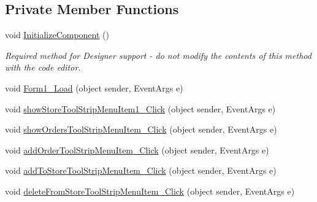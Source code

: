 \subsection*{Private Member Functions}
\begin{DoxyCompactItemize}
\item 
void \hyperlink{classproject__bot_1_1_form1_af9d680db4a881806f9fe79ba1c002df1}{Initialize\+Component} ()
\begin{DoxyCompactList}\small\item\em Required method for Designer support -\/ do not modify the contents of this method with the code editor. \end{DoxyCompactList}\item 
void \hyperlink{classproject__bot_1_1_form1_a6d312730b58049c8ee8527ca44bea75e}{Form1\+\_\+\+Load} (object sender, Event\+Args e)
\item 
void \hyperlink{classproject__bot_1_1_form1_a16b4ae77e7e32404669455ab50a7cc4e}{show\+Store\+Tool\+Strip\+Menu\+Item1\+\_\+\+Click} (object sender, Event\+Args e)
\item 
void \hyperlink{classproject__bot_1_1_form1_a47e7e9a67932bbfafd59a75a6d511238}{show\+Orders\+Tool\+Strip\+Menu\+Item\+\_\+\+Click} (object sender, Event\+Args e)
\item 
void \hyperlink{classproject__bot_1_1_form1_ae483d04b97a51a234a1120672f1655e4}{add\+Order\+Tool\+Strip\+Menu\+Item\+\_\+\+Click} (object sender, Event\+Args e)
\item 
void \hyperlink{classproject__bot_1_1_form1_a1d233cc400be90bb4bf0680a7e55511b}{add\+To\+Store\+Tool\+Strip\+Menu\+Item\+\_\+\+Click} (object sender, Event\+Args e)
\item 
void \hyperlink{classproject__bot_1_1_form1_a241665dc31d446e1f4a7482abbb8ad44}{delete\+From\+Store\+Tool\+Strip\+Menu\+Item\+\_\+\+Click} (object sender, Event\+Args e)
\end{DoxyCompactItemize}
